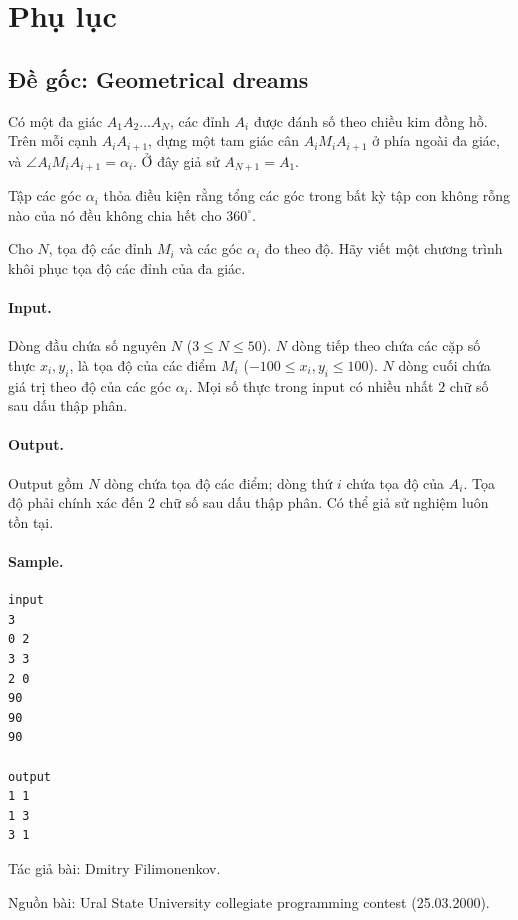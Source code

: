 \documentclass[11pt]{article}
\begin{document}
\appendix
\section{Phụ lục}

\subsection{Đề gốc: Geometrical dreams}

Có một đa giác $A_1A_2\ldots A_N$, các đỉnh $A_i$ được đánh số theo chiều kim
đồng hồ. Trên mỗi cạnh $A_iA_{i+1}$, dựng một tam giác cân
$A_iM_iA_{i+1}$ ở phía ngoài đa giác, và
$\angle A_iM_iA_{i+1}=\alpha_i$. Ở đây giả sử $A_{N+1}=A_1$.

Tập các góc $\alpha_i$ thỏa điều kiện rằng tổng các góc trong bất kỳ tập con
không rỗng nào của nó đều không chia hết cho $360^\circ$.

Cho $N$, tọa độ các đỉnh $M_i$ và các góc $\alpha_i$ đo theo độ. Hãy viết một
chương trình khôi phục tọa độ các đỉnh của đa giác.

\paragraph{Input.}
Dòng đầu chứa số nguyên $N$ ($3\le N\le 50$). $N$ dòng tiếp theo chứa các cặp
số thực $x_i,y_i$, là tọa độ của các điểm $M_i$
($-100\le x_i,y_i\le 100$). $N$ dòng cuối chứa giá trị theo độ của các góc
$\alpha_i$. Mọi số thực trong input có nhiều nhất $2$ chữ số sau dấu thập
phân.

\paragraph{Output.}
Output gồm $N$ dòng chứa tọa độ các điểm; dòng thứ $i$ chứa tọa độ của
$A_i$. Tọa độ phải chính xác đến $2$ chữ số sau dấu thập phân. Có thể giả sử
nghiệm luôn tồn tại.

\paragraph{Sample.}
\begin{verbatim}
input
3
0 2
3 3
2 0
90
90
90

output
1 1
1 3
3 1
\end{verbatim}

Tác giả bài: Dmitry Filimonenkov.

Nguồn bài: Ural State University collegiate programming contest
(25.03.2000).
\end{document}
